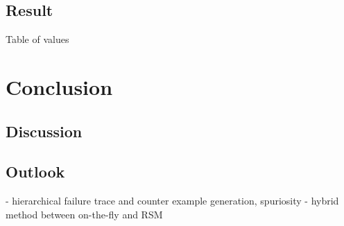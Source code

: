 \documentclass[a4paper, 12pt, twoside]{report}
\begin{document}
	\section{Result}
	Table of values
	
	\chapter{Conclusion}
	
	\section{Discussion}
		
	\section{Outlook}
	
		- hierarchical failure trace and counter example generation, spuriosity
	- hybrid method between on-the-fly and RSM
	
	
	{}
	
\end{document}
